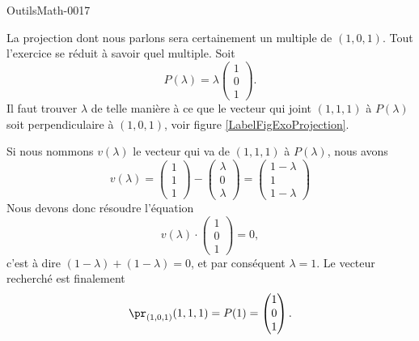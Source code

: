 
\begin{corrige}{OutilsMath-0017}



	\newcommand{\CaptionFigExoProjection}{Pour l'exercice \ref{exoOutilsMath-0017}. À partir du point $A$, il faut trouver quel vecteur tombe perpendiculairement à la droite contenant $w$.}


	La projection dont nous parlons sera certainement un multiple de $(1,0,1)$. Tout l'exercice se réduit à savoir quel multiple. Soit
	\begin{equation}
		P(\lambda)=\lambda\begin{pmatrix}
			1	\\ 
			0	\\ 
			1	
		\end{pmatrix}.
	\end{equation}
	Il faut trouver $\lambda$ de telle manière à ce que le vecteur qui joint $(1,1,1)$ à $P(\lambda)$ soit perpendiculaire à $(1,0,1)$, voir figure \ref{LabelFigExoProjection}.
	
	
	Si nous nommons $v(\lambda)$ le vecteur qui va de $(1,1,1)$ à $P(\lambda)$, nous avons
	\begin{equation}
		v(\lambda)=\begin{pmatrix}
			1	\\ 
			1	\\ 
			1	
		\end{pmatrix}-\begin{pmatrix}
			\lambda	\\ 
			0	\\ 
			\lambda	
		\end{pmatrix}=\begin{pmatrix}
			1-\lambda	\\ 
			1	\\ 
			1-\lambda	
		\end{pmatrix}
	\end{equation}
	Nous devons donc résoudre l'équation
	\begin{equation}
		v(\lambda)\cdot\begin{pmatrix}
			1	\\ 
			0	\\ 
			1	
		\end{pmatrix}=0,
	\end{equation}
	c'est à dire $(1-\lambda)+(1-\lambda)=0$, et par conséquent $\lambda=1$. Le vecteur recherché est finalement
	\begin{equation}
		\pr_{(1,0,1)}(1,1,1)=P(1)=\begin{pmatrix}
			1	\\ 
			0	\\ 
			1	
		\end{pmatrix}.
	\end{equation}

\end{corrige}
